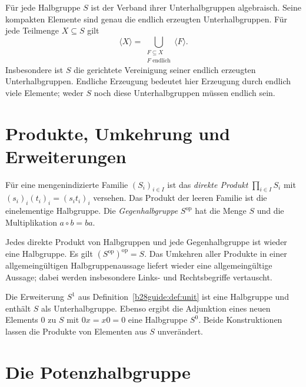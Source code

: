 \begin{theorem}
\label{b28guide:thm:algebraic-subsemigroups}
Für jede Halbgruppe $S$ ist der Verband ihrer Unterhalbgruppen
algebraisch. Seine kompakten Elemente sind genau die endlich erzeugten
Unterhalbgruppen. Für jede Teilmenge $X\subseteq S$ gilt
\[
 \langle X\rangle
 =\bigcup_{\substack{F\subseteq X\\F\text{ endlich}}}\langle F\rangle.
\]
Insbesondere ist $S$ die gerichtete Vereinigung seiner endlich erzeugten
Unterhalbgruppen. Endliche Erzeugung bedeutet hier Erzeugung durch
endlich viele Elemente; weder $S$ noch diese Unterhalbgruppen
müssen endlich sein. \cite{burris}
\end{theorem}

\section{Produkte, Umkehrung und Erweiterungen}

\begin{definition}
Für eine mengenindizierte Familie $(S_i)_{i\in I}$ ist das
\emph{direkte Produkt} $\prod_{i\in I}S_i$ mit
$(s_i)_i(t_i)_i=(s_it_i)_i$ versehen.
Das Produkt der leeren Familie ist die einelementige Halbgruppe.
Die \emph{Gegenhalbgruppe} $S^{\mathrm{op}}$ hat die Menge $S$ und
die Multiplikation $a\circ b=ba$.
\end{definition}

\begin{theorem}
Jedes direkte Produkt von Halbgruppen und jede Gegenhalbgruppe
ist wieder eine Halbgruppe. Es gilt
$(S^{\mathrm{op}})^{\mathrm{op}}=S$.
Das Umkehren aller Produkte in einer allgemeingültigen
Halbgruppenaussage liefert wieder eine allgemeingültige Aussage;
dabei werden insbesondere Links- und Rechtsbegriffe vertauscht.
\cite{harju,howie}
\end{theorem}

\begin{theorem}
Die Erweiterung $S^1$ aus Definition~\ref{b28guide:def:unit}
ist eine Halbgruppe und enthält $S$ als Unterhalbgruppe.
Ebenso ergibt die Adjunktion eines neuen Elements $0$ zu $S$
mit $0x=x0=0$ eine Halbgruppe $S^0$.
Beide Konstruktionen lassen die Produkte von Elementen aus $S$ unverändert.
\cite{harju,gould}
\end{theorem}

\section{Die Potenzhalbgruppe}

